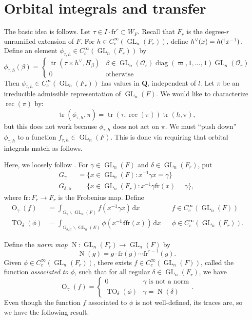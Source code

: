 \documentclass{article}
\DeclareMathOperator{\GL}{GL}
\DeclareMathOperator{\norm}{N}
\DeclareMathOperator{\orbital}{O}
\DeclareMathOperator{\reciprocity}{rec}
\DeclareMathOperator{\trace}{tr}
\DeclareMathOperator{\twistedorbital}{TO}
\newcommand{\frob}{\mathrm{fr}} %
\newcommand{\transpose}[1]{\prescript{\mathrm{t}}{}{#1}}
\newcommand{\cO}{\mathcal{O}}
\newcommand{\dQ}{\mathbf{Q}}
\begin{document}
\section{Orbital integrals and transfer}

The basic idea is follows. Let $\tau\in I\cdot \frob^r\subset W_F$. Recall 
that $F_r$ is the degree-$r$ unramified extension of $F$. For 
$h\in C_c^\infty(\GL_n(F_r))$, define $h^\vee(x) = h(\transpose x^{-1})$. 
Define an element $\phi_{\tau,h}\in C_c^\infty(\GL_n(F_r))$ by 
\begin{equation*}\tag{$\ast$}\label{eq:fun-def}
  \phi_{\tau,h}(\beta) = \begin{cases} \trace(\tau\times h^\vee,H_\beta) & \beta\in \GL_n(\cO_r)\operatorname{diag}(\varpi,1,\dots,1)\GL_n(\cO_r) \\ 0 & \text{otherwise} \end{cases}
\end{equation*}
Then $\phi_{\tau,h}\in C_c^\infty(\GL_n(F_r))$ has values in $\dQ$, independent 
of $l$. Let $\pi$ be an irreducible admissible representation of $\GL_n(F)$. 
We would like to characterize $\reciprocity(\pi)$ by: 
\[
  \trace(\phi_{\tau,h},\pi) = \trace(\tau,\reciprocity(\pi))\trace(h,\pi) ,
\]
but this does not work because $\phi_{\tau,h}$ does not act on $\pi$. We must 
``push down'' $\phi_{\tau,h}$ to a function $f_{\tau,h}\in \GL_n(F)$. This is 
done via requiring that orbital integrals match as follows. 

Here, we loosely follow \cite[1.3]{arthur-clozel-1989}. For 
$\gamma\in \GL_n(F)$ and $\delta\in \GL_n(F_r)$, put 
\begin{align*}
  G_\gamma &= \{x\in \GL_n(F):x^{-1} \gamma x = \gamma\} \\
  G_{\delta,\frob} &= \{x\in \GL_n(F_r):x^{-1} \gamma \frob(x) = \gamma\} ,
\end{align*}
where $\frob:F_r\to F_r$ is the Frobenius map. Define 
\begin{align*}
  \orbital_\gamma(f) 
    &= \int_{G_\gamma\backslash \GL_n(F)} f(x^{-1} \gamma x)\, \mathrm{d} \dot x && f\in C_c^\infty(\GL_n(F)) \\ 
  \twistedorbital_\delta(\phi) 
    &= \int_{G_{\delta,\frob}\backslash \GL_n(E)} \phi(x^{-1} \delta \frob(x))\, \mathrm{d}\dot x && \phi\in C_c^\infty(\GL_n(F_r)) .
\end{align*}

Define the \emph{norm map} $\norm:\GL_n(F_r)\to \GL_n(F)$ by 
\[
  \norm(g) = g\cdot \frob(g)\dotsm \frob^{r-1}(g) .
\]
Given $\phi\in C_c^\infty(\GL_n(F_r))$, there exists 
$f\in C_c^\infty(\GL_n(F))$, called the function \emph{associated to} $\phi$, 
such that for all regular $\delta\in \GL_n(F_r)$, we have 
\[
  \orbital_\gamma(f) = 
  \begin{cases} 
    0 & \gamma\text{ is not a norm} \\ 
    \twistedorbital_\delta(\phi) & \gamma=\norm(\delta)
  \end{cases} .
\]
Even though the function $f$ associated to $\phi$ is not well-defined, 
its traces are, so we have the following result. 
\end{document}
